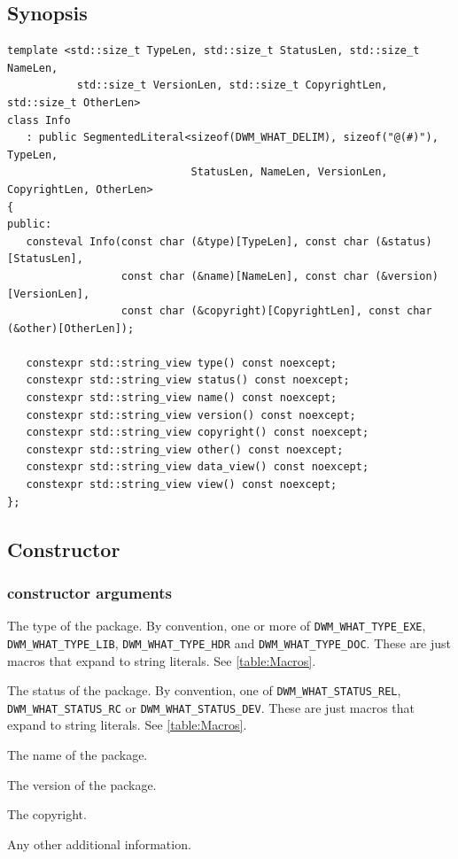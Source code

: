\begin{minipage}{\linewidth}
\subsection{Synopsis}

\begin{small}
\begin{verbatim}
template <std::size_t TypeLen, std::size_t StatusLen, std::size_t NameLen,
           std::size_t VersionLen, std::size_t CopyrightLen, std::size_t OtherLen>
class Info
   : public SegmentedLiteral<sizeof(DWM_WHAT_DELIM), sizeof("@(#)"), TypeLen,
                             StatusLen, NameLen, VersionLen, CopyrightLen, OtherLen>
{
public:
   consteval Info(const char (&type)[TypeLen], const char (&status)[StatusLen],
                  const char (&name)[NameLen], const char (&version)[VersionLen],
                  const char (&copyright)[CopyrightLen], const char (&other)[OtherLen]);

   constexpr std::string_view type() const noexcept;
   constexpr std::string_view status() const noexcept;
   constexpr std::string_view name() const noexcept;
   constexpr std::string_view version() const noexcept;
   constexpr std::string_view copyright() const noexcept;
   constexpr std::string_view other() const noexcept;
   constexpr std::string_view data_view() const noexcept;
   constexpr std::string_view view() const noexcept;
};
\end{verbatim}
\end{small}
\end{minipage}

\subsection{Constructor}
\subsubsection{constructor arguments}
\begin{description}[noitemsep,align=left,leftmargin=*,labelsep=10pt,itemindent=-\leftmargin,style=nextline]
\item[\texttt{type}] The type of the package.  By convention, one or more of
  \texttt{DWM\_WHAT\_TYPE\_EXE}, \texttt{DWM\_WHAT\_TYPE\_LIB},
  \texttt{DWM\_WHAT\_TYPE\_HDR} and \texttt{DWM\_WHAT\_TYPE\_DOC}.  These are
  just macros that expand to string literals.  See \autoref{table:Macros}.
\item[\texttt{status}] The status of the package.  By convention, one of
  \texttt{DWM\_WHAT\_STATUS\_REL}, \texttt{DWM\_WHAT\_STATUS\_RC} or
  \texttt{DWM\_WHAT\_STATUS\_DEV}.  These are just macros that expand to
  string literals.  See \autoref{table:Macros}.
  \item[\texttt{name}] The name of the package.
  \item[\texttt{version}] The version of the package.
  \item[\texttt{copyright}] The copyright.
  \item[\texttt{other}] Any other additional information.
\end{description}

